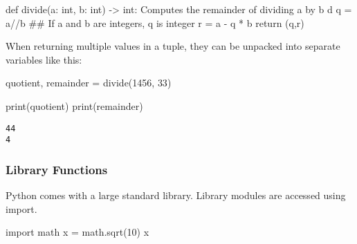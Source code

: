 \documentclass[
  letterpaper,
  DIV=11,
  numbers=noendperiod]{scrreprt}
\newenvironment{Shaded}{\begin{snugshade}}{\end{snugshade}}
\newcommand{\BuiltInTok}[1]{\textcolor[rgb]{0.00,0.46,0.62}{#1}}
\newcommand{\BuiltInTok}[1]{\textcolor[rgb]{0.00,0.48,0.65}{#1}}
\newcommand{\CommentTok}[1]{\textcolor[rgb]{0.37,0.37,0.37}{#1}}
\newcommand{\ControlFlowTok}[1]{\textcolor[rgb]{0.00,0.46,0.62}{#1}}
\newcommand{\ControlFlowTok}[1]{\textcolor[rgb]{0.00,0.48,0.65}{#1}}
\newcommand{\DecValTok}[1]{\textcolor[rgb]{0.68,0.00,0.00}{#1}}
\newcommand{\ImportTok}[1]{\textcolor[rgb]{0.00,0.46,0.62}{#1}}
\newcommand{\KeywordTok}[1]{\textcolor[rgb]{0.00,0.46,0.62}{#1}}
\newcommand{\NormalTok}[1]{\textcolor[rgb]{0.00,0.46,0.62}{#1}}
\newcommand{\OperatorTok}[1]{\textcolor[rgb]{0.37,0.37,0.37}{#1}}
\newcommand{\ImportTok}[1]{\textcolor[rgb]{0.00,0.48,0.65}{#1}}
\newcommand{\KeywordTok}[1]{\textcolor[rgb]{0.00,0.48,0.65}{#1}}
\newcommand{\NormalTok}[1]{\textcolor[rgb]{0.00,0.48,0.65}{#1}}
\newcommand{\OperatorTok}[1]{\textcolor[rgb]{0.37,0.37,0.37}{#1}}
\begin{document}
\begin{Shaded}
\begin{Highlighting}[]
\begin{Shaded}
\begin{Highlighting}[]
\KeywordTok{def}\NormalTok{ divide(a: }\BuiltInTok{int}\NormalTok{, b: }\BuiltInTok{int}\NormalTok{) }\OperatorTok{{-}\textgreater{}} \BuiltInTok{int}\NormalTok{:}
    \CommentTok{\textquotesingle{}\textquotesingle{}\textquotesingle{}  }
\CommentTok{    Computes the remainder of dividing a by b               }
\CommentTok{    d\textquotesingle{}\textquotesingle{}\textquotesingle{}}                
\NormalTok{    q   }\OperatorTok{=}\NormalTok{   a}\OperatorTok{//}\NormalTok{b }\CommentTok{\#\# If  a and b are integers, q is integer}
\NormalTok{    r   }\OperatorTok{=}\NormalTok{   a }\OperatorTok{{-}}\NormalTok{ q }\OperatorTok{*}\NormalTok{ b }
    \ControlFlowTok{return}\NormalTok{  (q,r)}
\end{Highlighting}
\end{Shaded}

When returning multiple values in a tuple, they can be unpacked into
separate variables like this:

\begin{Shaded}
\begin{Highlighting}[]
\NormalTok{quotient, remainder }\OperatorTok{=}\NormalTok{ divide(}\DecValTok{1456}\NormalTok{,  }\DecValTok{33}\NormalTok{)}
\end{Highlighting}
\end{Shaded}

\begin{Shaded}
\begin{Highlighting}[]
\BuiltInTok{print}\NormalTok{(quotient)}
\BuiltInTok{print}\NormalTok{(remainder)}
\end{Highlighting}
\end{Shaded}

\begin{verbatim}
44
4
\end{verbatim}

\hypertarget{library-functions}{%
\subsubsection{Library Functions}\label{library-functions}}

Python comes with a large standard library. Library modules are accessed
using import.

\begin{Shaded}
\begin{Highlighting}[]
\ImportTok{import}\NormalTok{ math}
\NormalTok{x }\OperatorTok{=}\NormalTok{ math.sqrt(}\DecValTok{10}\NormalTok{)}
\NormalTok{x}
\end{Highlighting}
\end{Shaded}


\end{Highlighting}
\end{Shaded}
\end{document}
